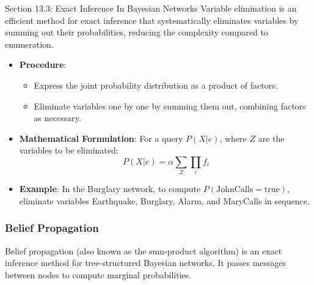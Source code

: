 \begin{notes}{Section 13.3: Exact Inference In Bayesian Networks}
    Variable elimination is an efficient method for exact inference that systematically eliminates variables by summing out their probabilities, reducing the complexity compared to enumeration.
    
    \begin{highlight}
    
        \begin{itemize}
            \item \textbf{Procedure}: 
                \begin{itemize}
                    \item Express the joint probability distribution as a product of factors.
                    \item Eliminate variables one by one by summing them out, combining factors as necessary.
                \end{itemize}
            \item \textbf{Mathematical Formulation}: For a query $P(X | e)$, where $Z$ are the variables to be eliminated:
            \[
            P(X | e) = \alpha \sum_{Z} \prod_{i} f_i
            \]
            \item \textbf{Example}: In the Burglary network, to compute $P(\text{JohnCalls} = \text{true})$, eliminate variables Earthquake, Burglary, Alarm, and MaryCalls in sequence.
        \end{itemize}
    
    \end{highlight}
    
    \subsubsection*{Belief Propagation}
    
    Belief propagation (also known as the sum-product algorithm) is an exact inference method for tree-structured Bayesian networks. It passes messages between nodes to compute marginal probabilities.
    
    \begin{highlight}
    

\end{highlight}
\end{notes}
